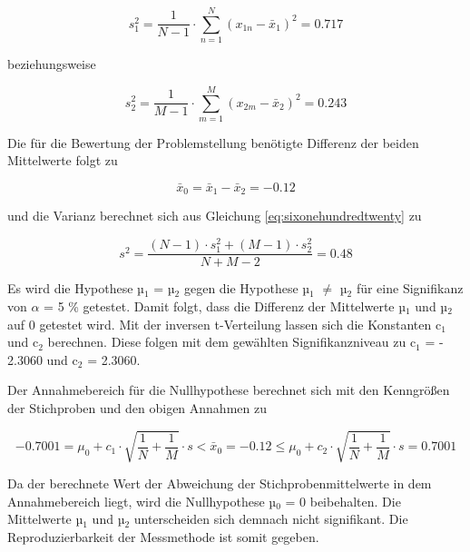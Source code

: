 \begin{equation}\label{eq:sixonehundredthirtyfive}
s_{1}^{2} =\dfrac{1}{N-1} \cdot \sum _{n=1}^{N}\left(x_{1n} -\bar{x}_{1} \right)^{2}  =0.717
\end{equation}

\noindent beziehungsweise

\begin{equation}\label{eq:sixonehundredthirtysix}
s_{2}^{2} =\dfrac{1}{M-1} \cdot \sum _{m=1}^{M}\left(x_{2m} -\bar{x}_{2} \right)^{2}  =0.243
\end{equation}

\noindent Die f\"{u}r die Bewertung der Problemstellung ben\"{o}tigte Differenz der beiden Mittelwerte folgt zu

\begin{equation}\label{eq:sixonehundredthirtyseven}
\bar{x}_{0} =\bar{x}_{1} -\bar{x}_{2} =-0.12
\end{equation}

\noindent und die Varianz berechnet sich aus Gleichung \eqref{eq:sixonehundredtwenty} zu

\begin{equation}\label{eq:sixonehundredthirtyeight}
s^{2} =\dfrac{(N-1)\cdot s_{1}^{2} +(M-1)\cdot s_{2}^{2} }{N+M-2} =0.48
\end{equation}

\noindent Es wird die Hypothese µ$_{1}$ = µ$_{2}$ gegen die Hypothese µ$_{1}$ $\neq$ µ$_{2}$ f\"{u}r eine Signifikanz von $\alpha$ = 5 \% getestet. Damit folgt, dass die Differenz der Mittelwerte µ$_{1}$ und µ$_{2}$ auf 0 getestet wird. Mit der inversen t-Verteilung lassen sich die Konstanten c$_{1}$ und c$_{2}$ berechnen. Diese folgen mit dem gew\"{a}hlten Signifikanzniveau zu c$_{1}$ = - 2.3060 und c$_{2}$ = 2.3060.\newline

\noindent Der Annahmebereich f\"{u}r die Nullhypothese berechnet sich mit den Kenngr\"{o}{\ss}en der Stichproben und den obigen Annahmen zu

\begin{equation}\label{eq:sixonehundredthirtynine}
-0.7001=\mu _{0} +c_{1} \cdot \sqrt{\dfrac{1}{N} +\dfrac{1}{M} } \cdot s<\bar{x}_{0} =-0.12\le \mu _{0} +c_{2} \cdot \sqrt{\dfrac{1}{N} +\dfrac{1}{M} } \cdot s=0.7001
\end{equation}

\noindent Da der berechnete Wert der Abweichung der Stichprobenmittelwerte in dem Annahmebereich liegt, wird die Nullhypothese µ$_{0}$ = 0 beibehalten. Die Mittelwerte µ$_{1}$ und µ$_{2}$ unterscheiden sich demnach nicht signifikant. Die Reproduzierbarkeit der Messmethode ist somit gegeben.\newline

